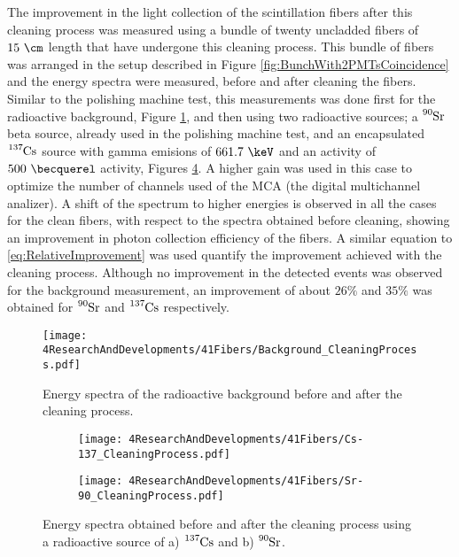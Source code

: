 The improvement in the light collection of the scintillation fibers after this cleaning process was measured using a bundle of twenty uncladded fibers of $15~\cm$ length that have undergone this cleaning process. This bundle of fibers was arranged in the setup described in Figure \ref{fig:BunchWith2PMTsCoincidence} and the energy spectra were measured, before and after cleaning the fibers. Similar to the polishing machine test, this measurements was done first for the radioactive background, Figure \ref{fig:ResultsOfCleaningProcessBackground}, and then using two radioactive sources; a $\ce{^{90}Sr}$ beta source, already used in the polishing machine test, and an encapsulated $\ce{^{137}Cs}$ source with gamma emisions of $661.7~\keV$ and an activity of $500~\becquerel$ activity, Figures \ref{fig:ResultsOfCleaningProcessSource}. A higher gain was used in this case to optimize the number of channels used of the MCA (the digital multichannel analizer). A shift of the spectrum to higher energies is observed in all the cases for the clean fibers, with respect to the spectra obtained before cleaning, showing an improvement in photon collection efficiency of the fibers. A similar equation to \ref{eq:RelativeImprovement} was used  quantify the improvement achieved with the cleaning process. Although no improvement in the detected events was observed for the background measurement, an improvement of about $26\%$ and $35\%$ was obtained for $\ce{^{90}Sr}$ and $\ce{^{137}Cs}$ respectively.

\begin{figure}[h]
\centering
\texttt{[image: 4ResearchAndDevelopments/41Fibers/Background\_CleaningProcess.pdf]}
\caption{Energy spectra of the radioactive background before and after the cleaning process.\label{fig:ResultsOfCleaningProcessBackground}}
\end{figure}

\begin{figure}
\centering
    \begin{subfigure}[b]{1\textwidth}
    \centering
    \texttt{[image: 4ResearchAndDevelopments/41Fibers/Cs-137\_CleaningProcess.pdf]}  
    \caption{\label{subfig:EnergySpectrumCo60CleaningTest}}
    \end{subfigure}
    \hfill
    \begin{subfigure}[b]{1\textwidth}
    \centering
    \texttt{[image: 4ResearchAndDevelopments/41Fibers/Sr-90\_CleaningProcess.pdf]}  
    \caption{\label{subfig:EnergySpectrumSr90CleaningTest}}
    \end{subfigure}
 \caption{Energy spectra obtained before and after the cleaning process using a radioactive source of a) $\ce{^{137}Cs}$ and b) $\ce{^{90}Sr}$.}
 \label{fig:ResultsOfCleaningProcessSource}
\end{figure}


